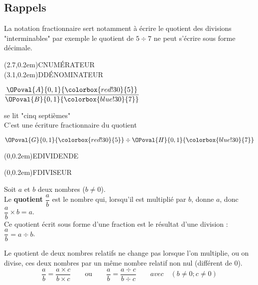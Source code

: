 \begin{changemargin}{0mm}{-15mm}
    \section{Rappels} %
    \begin{remarque}
        La notation fractionnaire sert notamment à écrire le quotient des divisions "interminables" par exemple le quotient de $5\div 7$ ne peut s'écrire sous forme décimale.
    \end{remarque}
    
    \vspace*{-7mm}
    \begin{minipage}[c]{0.2\linewidth}
        \pnode(2.7,0.2em){C}{\colorbox{red!30}{NUMÉRATEUR}}\\	
        \pnode(3.1,0.2em){D}{\colorbox{blue!30}{DÉNOMINATEUR}}
    \end{minipage}
    $\dfrac{\OPoval{A}{0,1}{\colorbox{red!30}{5}}}{\OPoval{B}{0,1}{\colorbox{blue!30}{7}}}$\qquad
    \begin{minipage}[c]{0.4\linewidth}
    se lit "cinq septièmes"\\
    C'est une écriture fractionnaire du quotient    
    \end{minipage}
    $\OPoval{G}{0,1}{\colorbox{red!30}{5}} \div \OPoval{H}{0,1}{\colorbox{blue!30}{7}}$\qquad
    \begin{minipage}[c]{0.3\linewidth}
        \pnode(0,0.2em){E}{\colorbox{red!30}{DIVIDENDE}}
        \par\vspace{2.5cm}
        \pnode(0,0.2em){F}{\colorbox{blue!30}{DIVISEUR}}
    \end{minipage}
    \vspace*{-10mm}

    \begin{definition}
        Soit $a$ et $b$ deux nombres ($b\neq0$).\\
        Le {\bf quotient} $\dfrac{a}{b}$ est le nombre qui, lorsqu'il est multiplié par $b$, donne $a$, donc  $\dfrac{a}{b}\times b = a$.\\
        Ce quotient écrit sous forme d'une fraction est le résultat d'une division : $\dfrac{a}{b} =a\div b$.
    \end{definition}

    \begin{propriete}
        Le quotient de deux nombres relatifs ne change pas lorsque l'on multiplie, ou on divise, ces deux nombres par un même nombre
        relatif non nul (différent de 0).
        $$\frac{a}{b}=\frac{a\times c}{b\times c}\qquad \text{ou} \qquad \frac{a}{b}=\frac{a\div c}{b\div c}\qquad avec \quad  (b\not=0; c\not=0)$$
    \end{propriete}
\end{changemargin}